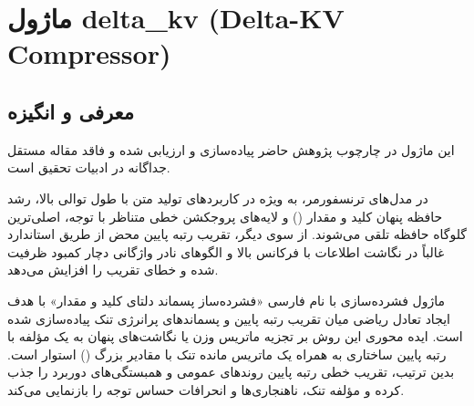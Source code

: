 \section{ماژول delta\_kv (Delta-KV Compressor)}
\label{sec:module_delta_kv}

\subsection{معرفی و انگیزه}
این ماژول در چارچوب پژوهش حاضر پیاده‌سازی و ارزیابی شده و فاقد مقاله مستقل جداگانه در ادبیات تحقیق است.

در مدل‌های ترنسفورمر، به ویژه در کاربردهای تولید متن با طول توالی بالا، رشد حافظه پنهان کلید و مقدار () و لایه‌های پروجکشن خطی متناظر با توجه، اصلی‌ترین گلوگاه حافظه تلقی می‌شوند. از سوی دیگر، تقریب رتبه پایین محض از طریق  استاندارد غالباً در نگاشت اطلاعات با فرکانس بالا و الگوهای نادر واژگانی دچار کمبود ظرفیت شده و خطای تقریب را افزایش می‌دهد.

ماژول فشرده‌سازی  با نام فارسی «فشرده‌ساز پسماند دلتای کلید و مقدار» با هدف ایجاد تعادل ریاضی میان تقریب رتبه پایین و پسماندهای پرانرژی تنک پیاده‌سازی شده است. ایده محوری این روش بر تجزیه ماتریس وزن یا نگاشت‌های پنهان به یک مؤلفه با رتبه پایین ساختاری به همراه یک ماتریس مانده تنک با مقادیر بزرگ () استوار است. بدین ترتیب، تقریب خطی رتبه پایین روندهای عمومی و همبستگی‌های دوربرد را جذب کرده و مؤلفه تنک، ناهنجاری‌ها و انحرافات حساس توجه را بازنمایی می‌کند.

